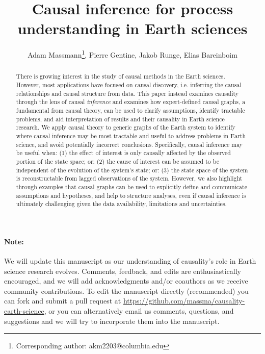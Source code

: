 \documentclass[12pt]{article}
\begin{document}
\title{Causal inference for process understanding in Earth sciences}

\author{Adam Massmann\thanks{Corresponding author:
    akm2203@columbia.edu}, Pierre Gentine, Jakob Runge, Elias Bareinboim}

\maketitle
\begin{abstract}
  There is growing interest in the study of causal methods in the
  Earth sciences. However, most applications have focused on causal
  discovery, i.e. inferring the causal relationships and causal
  structure from data. This paper instead examines causality through
  the lens of causal {\it inference} and examines how expert-defined
  causal graphs, a fundamental from causal theory, can be used to
  clarify assumptions, identify tractable problems, and aid
  interpretation of results and their causality in Earth science
  research. We apply causal theory to generic graphs of the Earth
  system to identify where causal inference may be most tractable and
  useful to address problems in Earth science, and avoid potentially
  incorrect conclusions. Specifically, causal inference may be useful
  when: (1) the effect of interest is only causally affected by the
  observed portion of the state space; or: (2) the cause of interest
  can be assumed to be independent of the evolution of the system’s
  state; or: (3) the state space of the system is reconstructable from
  lagged observations of the system. However, we also highlight
  through examples that causal graphs can be used to explicitly define
  and communicate assumptions and hypotheses, and help to structure
  analyses, even if causal inference is ultimately challenging given
  the data availability, limitations and uncertainties.
\end{abstract}

\paragraph{Note:} We will update this manuscript as our understanding
of causality's role in Earth science research evolves. Comments,
feedback, and edits are enthusiastically encouraged, and we will add
acknowledgments and/or coauthors as we receive community
contributions. To edit the manuscript directly (recommended) you can
fork and submit a pull request at
\url{https://github.com/massma/causality-earth-science}, or you can
alternatively email us comments, questions, and suggestions and we
will try to incorporate them into the manuscript.
\end{document}
